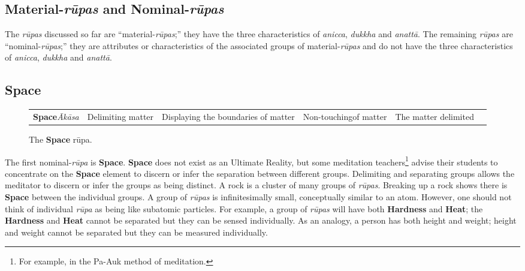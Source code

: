 \subsection*{Material-\textit{rūpas} and Nominal-\textit{rūpas}}

The \textit{rūpas} discussed so far are “material-\textit{rūpas};” they have the three characteristics of \textit{anicca}, \textit{dukkha} and \textit{anattā}. The remaining \textit{rūpas} are “nominal-\textit{rūpas};” they are attributes or characteristics of the associated groups of material-\textit{rūpas} and do not have the three characteristics of \textit{anicca}, \textit{dukkha} and \textit{anattā}.

\subsection*{Space}

\begin{figure} [H]
\setlength{\tabcolsep}{0pt}
\renewcommand{\arraystretch}{1.1}
\noindent\begin{tabular}{P{0.25\textwidth} | C{.185\textwidth} C{0.185\textwidth} C{0.185\textwidth} C{0.195\textwidth} m{0mm}}
\toprule
 &  &  &  & \\
\midrule
\textbf{Space}\newline \textit{Ākāsa} & Delimiting matter & Displaying the boundaries of matter & Non-touching\newline of matter & The matter delimited &\\[9mm]

\bottomrule
\end{tabular}
\caption[]{The \textbf{Space} rūpa.\footnotemark}
\end{figure}


The first nominal-\textit{rūpa} is \textbf{Space}. \textbf{Space} does not exist as an Ultimate Reality, but some meditation teachers\footnote{For example, in the Pa-Auk method of meditation.} advise their students to concentrate on the \textbf{Space} element to discern or infer the separation between different groups. Delimiting and separating groups allows the meditator to discern or infer the groups as being distinct. A rock is a cluster of many groups of \textit{rūpas}. Breaking up a rock shows there is \textbf{Space} between the individual groups. A group of \textit{rūpas} is infinitesimally small, conceptually similar to an atom. However, one should not think of individual \textit{rūpa} as being like subatomic particles. For example, a group of \textit{rūpas} will have both \textbf{Hardness} and \textbf{Heat}; the \textbf{Hardness} and \textbf{Heat} cannot be separated but they can be sensed individually. As an analogy, a person has both height and weight; height and weight cannot be separated but they can be measured individually.

